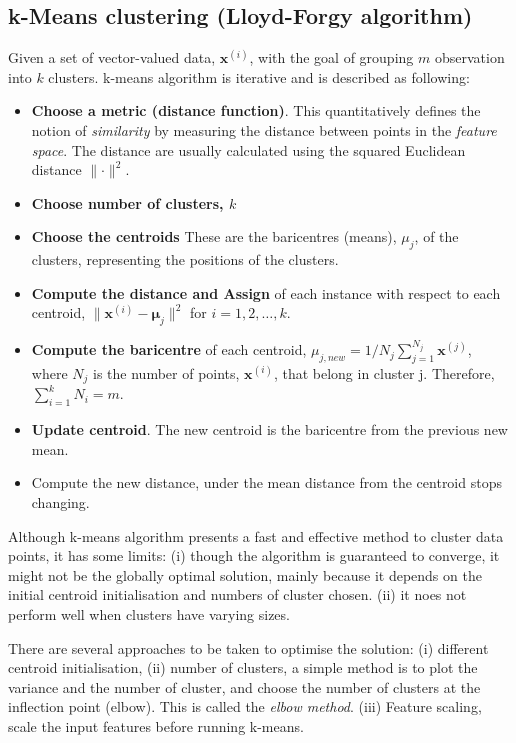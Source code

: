 \documentclass[a4paper,10pt]{article}
\begin{document}
\subsection{k-Means clustering (Lloyd-Forgy algorithm)}
Given a set of vector-valued data, $\mathbf{x}^{(i)}$, with the goal of grouping $m$ observation into $k$ clusters. k-means algorithm is iterative and is described as following:
\begin{itemize}
    \item \textbf{Choose a metric (distance function)}. This quantitatively defines the notion of \textit{similarity} by measuring the distance between points in the \textit{feature space}. The distance are usually calculated using the squared Euclidean distance $\lVert\cdot\rVert^2$.
    \item \textbf{Choose number of clusters, $k$}
    \item \textbf{Choose the centroids} These are the baricentres (means), $\mu_j$, of the clusters, representing the positions of the clusters. 
    \item \textbf{Compute the distance and Assign} of each instance with respect to each centroid, $\lVert\pmb{x}^{(i)}-\pmb{\mu}_j\rVert^2$ for $i=1,2,\dots, k$.
    \item \textbf{Compute the baricentre} of each centroid, $\mu_{j,new}=1/N_j\sum_{j=1}^{N_j}\pmb{x}^{(j)}$, where $N_j$ is the number of points, $\pmb{x}^{(i)}$, that belong in cluster j. Therefore, $\sum_{i=1}^{k}N_i=m$. 
    \item \textbf{Update centroid}. The new centroid is the baricentre from the previous new mean. 
    \item Compute the new distance, under the mean distance from the centroid stops changing. 
\end{itemize}

Although k-means algorithm presents a fast and effective method to cluster data points, it has some limits: (i) though the algorithm is guaranteed to converge, it might not be the globally optimal solution, mainly because it depends on the initial centroid initialisation and numbers of cluster chosen. (ii) it noes not perform well when clusters have varying sizes.\par 

There are several approaches to be taken to optimise the solution: (i) different centroid initialisation, (ii) number of clusters, a simple method is to plot the variance and the number of cluster, and choose the number of clusters at the inflection point (elbow). This is called the \textit{elbow method}. (iii) Feature scaling, scale the input features before running k-means. 
\end{document}
